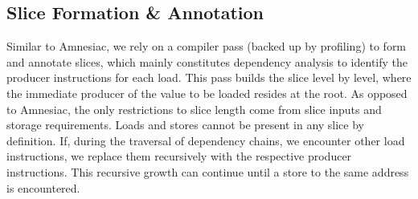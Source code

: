  
\subsection{Slice Formation \& Annotation}
Similar to Amnesiac, we rely on a compiler pass (backed up by profiling) to form and annotate slices, which 
 mainly constitutes
dependency analysis to
identify the producer instructions for each load.
This pass builds the slice level by level, where
the immediate producer of the value to be loaded resides at the root.
As opposed to Amnesiac, the only restrictions to slice length come from slice inputs and storage requirements. 
Loads and stores cannot be present in any slice by definition.
If, during the traversal of dependency chains, we encounter other load instructions, we 
replace them recursively with the respective producer instructions. 
This recursive growth can continue until a store to the same address is encountered.

